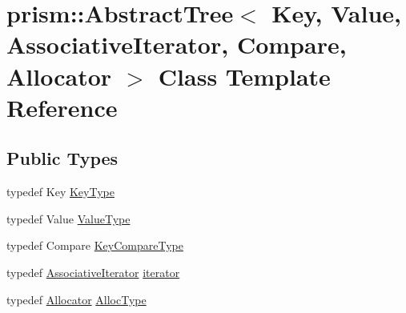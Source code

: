 \hypertarget{classprism_1_1_abstract_tree}{}\section{prism\+:\+:Abstract\+Tree$<$ Key, Value, Associative\+Iterator, Compare, Allocator $>$ Class Template Reference}
\label{classprism_1_1_abstract_tree}
\subsection*{Public Types}
\begin{DoxyCompactItemize}
\item 
typedef Key \hyperlink{classprism_1_1_abstract_tree_a8e7c15cc5a5b1e475396f04b5c8d6791}{Key\+Type}
\item 
typedef Value \hyperlink{classprism_1_1_abstract_tree_aeb1365316ef6bbaf6f7d33053a507707}{Value\+Type}
\item 
typedef Compare \hyperlink{classprism_1_1_abstract_tree_ad26cf2f1010ba3e5bdf74ba773b0afb1}{Key\+Compare\+Type}
\item 
typedef \hyperlink{structprism_1_1_associative_iterator}{Associative\+Iterator} \hyperlink{classprism_1_1_abstract_tree_add0af156a67312ca397d703c531e32fd}{iterator}
\item 
typedef \hyperlink{classprism_1_1_allocator}{Allocator} \hyperlink{classprism_1_1_abstract_tree_a88f27ac6f626ae6f4282546765a11bf6}{Alloc\+Type}
\end{DoxyCompactItemize}
